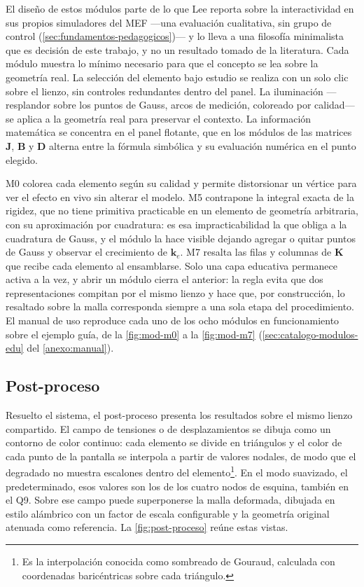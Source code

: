 El diseño de estos módulos parte de lo que Lee reporta sobre la interactividad en sus propios simuladores del MEF \autocite[pp.~158, 166]{lee2015interactive} —una evaluación cualitativa, sin grupo de control (\autoref{sec:fundamentos-pedagogicos})— y lo lleva a una filosofía minimalista que es decisión de este trabajo, y no un resultado tomado de la literatura. Cada módulo muestra lo mínimo necesario para que el concepto se lea sobre la geometría real. La selección del elemento bajo estudio se realiza con un solo clic sobre el lienzo, sin controles redundantes dentro del panel. La iluminación —resplandor sobre los puntos de Gauss, arcos de medición, coloreado por calidad— se aplica a la geometría real para preservar el contexto. La información matemática se concentra en el panel flotante, que en los módulos de las matrices $\bm{J}$, $\bm{B}$ y $\bm{D}$ alterna entre la fórmula simbólica y su evaluación numérica en el punto elegido.

M0 colorea cada elemento según su calidad y permite distorsionar un vértice para ver el efecto en vivo sin alterar el modelo. M5 contrapone la integral exacta de la rigidez, que no tiene primitiva practicable en un elemento de geometría arbitraria, con su aproximación por cuadratura: es esa impracticabilidad la que obliga a la cuadratura de Gauss, y el módulo la hace visible dejando agregar o quitar puntos de Gauss y observar el crecimiento de $\bm{k}_e$. M7 resalta las filas y columnas de $\bm{K}$ que recibe cada elemento al ensamblarse. Solo una capa educativa permanece activa a la vez, y abrir un módulo cierra el anterior: la regla evita que dos representaciones compitan por el mismo lienzo y hace que, por construcción, lo resaltado sobre la malla corresponda siempre a una sola etapa del procedimiento. El manual de uso reproduce cada uno de los ocho módulos en funcionamiento sobre el ejemplo guía, de la \autoref{fig:mod-m0} a la \autoref{fig:mod-m7} (\autoref{sec:catalogo-modulos-edu} del \autoref{anexo:manual}).

\subsection{Post-proceso}
\label{sec:post-proceso}

Resuelto el sistema, el post-proceso presenta los resultados sobre el mismo lienzo compartido. El campo de tensiones o de desplazamientos se dibuja como un contorno de color continuo: cada elemento se divide en triángulos y el color de cada punto de la pantalla se interpola a partir de valores nodales, de modo que el degradado no muestra escalones dentro del elemento\footnote{Es la interpolación conocida como sombreado de Gouraud, calculada con coordenadas baricéntricas sobre cada triángulo.}. En el modo suavizado, el predeterminado, esos valores son los de los cuatro nodos de esquina, también en el Q9. Sobre ese campo puede superponerse la malla deformada, dibujada en estilo alámbrico con un factor de escala configurable y la geometría original atenuada como referencia. La \autoref{fig:post-proceso} reúne estas vistas.

